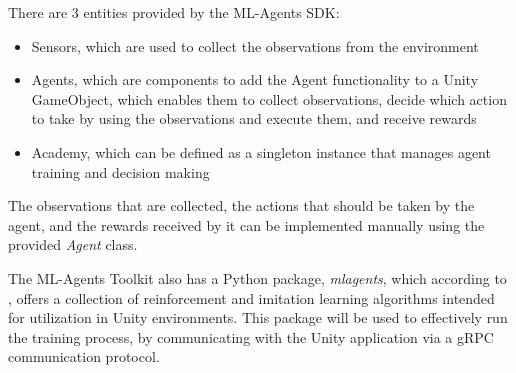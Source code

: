 There are 3 entities provided by the ML-Agents SDK:
\begin{itemize}
    \item Sensors, which are used to collect the observations from the environment
    \item Agents, which are components to add the Agent functionality to a Unity GameObject, which enables them to collect observations, decide which action to take by using the observations and execute them, and receive rewards
    \item Academy, which can be defined as a singleton instance that manages agent training and decision making \cite{mlagents_api_docs}
\end{itemize}

The observations that are collected, the actions that should be taken by the agent, and the rewards received by it can be implemented manually using the provided \emph{Agent} class.

The ML-Agents Toolkit also has a Python package, \emph{mlagents}, which according to \cite{mlagents_pypi}, offers a collection of reinforcement and imitation learning algorithms intended for utilization in Unity environments. This package will be used to effectively run the training process, by communicating with the Unity application via a gRPC communication protocol.


